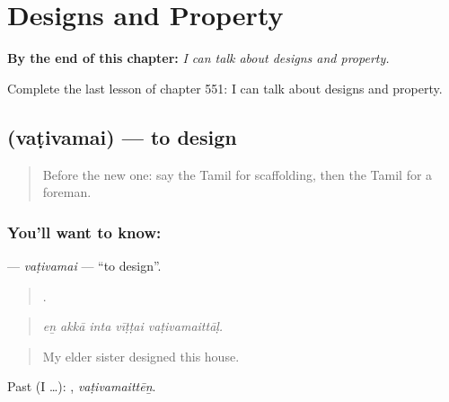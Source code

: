
\chapter{Designs and Property}
\label{ch:ta-designs-and-property}

\begin{chapteropening}
\textbf{By the end of this chapter:} \emph{I can talk about designs and property.}

Complete the last lesson of chapter 551: I can talk about designs and property.
\end{chapteropening}

\section[\texorpdfstring{\ta{வடிவமை} (vaṭivamai)}{வடிவமை (vaṭivamai)}]{ (vaṭivamai) — to design}

\label{lesson:TA-C551-vativamai}



\begin{quote}
Before the new one: say the Tamil for scaffolding, then the Tamil for a foreman.
\end{quote}

\subsection*{You'll want to know: }
\textbf{} — \emph{vaṭivamai} — \textquotedblleft{}to design\textquotedblright{}.

\begin{quote}
    .
\end{quote}

\begin{quote}
\emph{eṉ akkā inta vīṭṭai vaṭivamaittāḷ.}
\end{quote}

\begin{quote}
My elder sister designed this house.
\end{quote}

Past (I …): , \emph{vaṭivamaittēṉ}.

